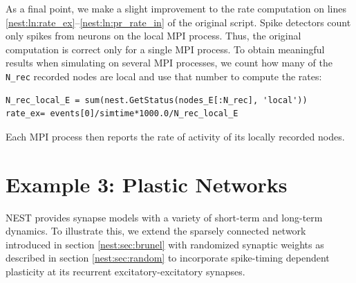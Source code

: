 \documentclass{article}
\begin{document}
As a final point, we make a slight improvement to the rate computation on
lines \ref{nest:ln:rate_ex}--\ref{nest:ln:pr_rate_in} of the original
script. Spike detectors count only spikes from neurons on the local
MPI process. Thus, the original computation is correct only for a
single MPI process. To obtain meaningful results when simulating
on several MPI processes, we count how many of the \lstinline!N_rec!
recorded nodes are local and use that number to compute the rates:
\begin{lstlisting}[name=brunel-rand]
N_rec_local_E = sum(nest.GetStatus(nodes_E[:N_rec], 'local'))
rate_ex= events[0]/simtime*1000.0/N_rec_local_E
\end{lstlisting}
Each MPI process then reports the rate of activity of its locally
recorded nodes.



\section{Example 3: Plastic Networks}\label{nest:sec:plastic}

\renewcommand*\thelstnumber{p\arabic{lstnumber}}

NEST provides synapse models with a variety of short-term and
long-term dynamics. To illustrate this, we extend the sparsely
connected network introduced in section \ref{nest:sec:brunel} with
randomized synaptic weights as described in section
\ref{nest:sec:random} to incorporate spike-timing dependent plasticity
\citep{Bi98} at its recurrent excitatory-excitatory synapses.
\end{document}
